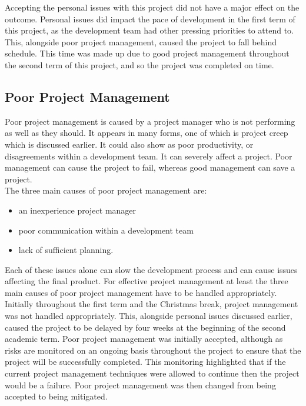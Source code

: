\documentclass{article}
\begin{document}
Accepting the personal issues with this project did not have a major effect on the outcome. Personal issues did impact the pace of development in the first term of this project, as the development team had other pressing priorities to attend to. This, alongside poor project management, caused the project to fall behind schedule. This time was made up due to good project management throughout the second term of this project, and so the project was completed on time. \\

\subsection{Poor Project Management}

Poor project management is caused by a project manager who is not performing as well as they should. It appears in many forms, one of which is project creep which is discussed earlier. It could also show as poor productivity, or disagreements within a development team. It can severely affect a project. Poor management can cause the project to fail, whereas good management can save a project. \\

The three main causes of poor project management are:

\begin{itemize}
	\item an inexperience project manager
	\item poor communication within a development team
	\item lack of sufficient planning.
\end{itemize}

Each of these issues alone can slow the development process and can cause issues affecting the final product. For effective project management at least the three main causes of poor project management have to be handled appropriately. \\

Initially throughout the first term and the Christmas break, project management was not handled appropriately. This, alongside personal issues discussed earlier, caused the project to be delayed by four weeks at the beginning of the second academic term. Poor project management was initially accepted, although as risks are monitored on an ongoing basis throughout the project to ensure that the project will be successfully completed. This monitoring highlighted that if the current project management techniques were allowed to continue then the project would be a failure. Poor project management was then changed from being accepted to being mitigated. \\
\end{document}
